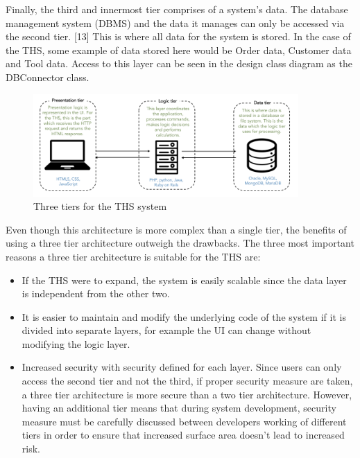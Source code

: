 \documentclass[fontsize=11pt]{extarticle}
\numberwithin{figure}{section} %
\numberwithin{table}{section}%
\begin{document}
Finally, the third and innermost tier comprises of a system's data. The
database management system (DBMS) and the data it manages can only be
accessed via the second tier. {[}13{]} This is where all data for the
system is stored. In the case of the THS, some example of data stored
here would be Order data, Customer data and Tool data. Access to this
layer can be seen in the design class diagram as the DBConnector class.

\begin{figure}[H]
      \centering
      \includegraphics[trim = 0 0 0 0, clip, width=0.9\textwidth]{TempImg/3TA.png}
      \caption{Three tiers for the THS system}
\end{figure}

Even though this architecture is more complex than a single tier, the
benefits of using a three tier architecture outweigh the drawbacks. The
three most important reasons a three tier architecture is suitable for
the THS are:

\begin{itemize}
  \item If the THS were to expand, the system is easily scalable since the data layer is independent from the other two.

  \item It is easier to maintain and modify the underlying code of the system if it is divided into separate layers, for example the UI can change without modifying the logic layer.

  \item Increased security with security defined for each layer. Since users can only access the second tier and not the third, if proper security measure are taken, a three tier architecture is more secure than a two tier architecture. However, having an additional tier means that during system development, security measure must be carefully discussed between developers working of different tiers in order to ensure that increased surface area doesn’t lead to increased risk. 

\end{itemize}
\end{document}
